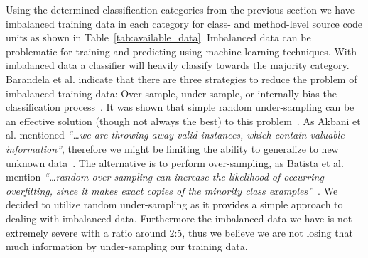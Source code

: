 Using the determined classification categories from the previous section we have imbalanced training data in each category for class- and method-level source code units as shown in Table~\ref{tab:available_data}. Imbalanced data can be problematic for training and predicting using machine learning techniques. With imbalanced data a classifier will heavily classify towards the majority category. Barandela et al. indicate that there are three strategies to reduce the problem of imbalanced training data: Over-sample, under-sample, or internally bias the classification process~\cite{BVSF04}. It was shown that simple random under-sampling can be an effective solution (though not always the best) to this problem~\cite{Jap00,AKJ04}. As Akbani et al. mentioned \emph{``\ldots we are throwing away valid instances, which contain valuable information''}, therefore we might be limiting the ability to generalize to new unknown data~\cite{AKJ04}. The alternative is to perform over-sampling, as Batista et al. mention \emph{``\ldots random over-sampling can increase the likelihood of occurring overﬁtting, since it makes exact copies of the minority class examples''}~\cite{BPM04}. We decided to utilize random under-sampling as it provides a simple approach to dealing with imbalanced data. Furthermore the imbalanced data we have is not extremely severe with a ratio around 2:5, thus we believe we are not losing that much information by under-sampling our training data.

